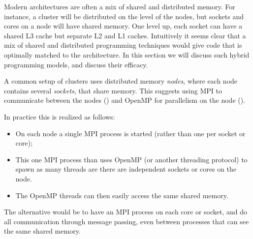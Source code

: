 
Modern architectures are often a mix of shared and distributed
memory. For instance, a cluster will be distributed on the level of
the nodes, but sockets and cores on a node will have shared
memory. One level up, each socket can have a shared L3 cache but
separate L2 and L1 caches. Intuitively it seems clear that a mix of
shared and distributed programming techniques would give code
that is optimally matched to the architecture. In this section we will
discuss such hybrid programming models, and discuss their efficacy.

A common setup of clusters uses distributed memory
\emph{nodes}, where each node contains several
\emph{sockets}, that share memory. This suggests
using MPI to communicate between the nodes
() and OpenMP for parallelism on
the node ().

In practice this is realized as follows:
\begin{itemize}
\item On each node a single MPI process is started (rather than one
  per socket or core);
\item This one MPI process than uses OpenMP (or another threading
  protocol) to spawn as many threads are there are independent sockets
  or cores on the node.
\item The OpenMP threads can then easily access the same shared memory.
\end{itemize}
The alternative would be to have an MPI process on each core or
socket, and do all communication through message passing, even between
processes that can see the same shared memory.

